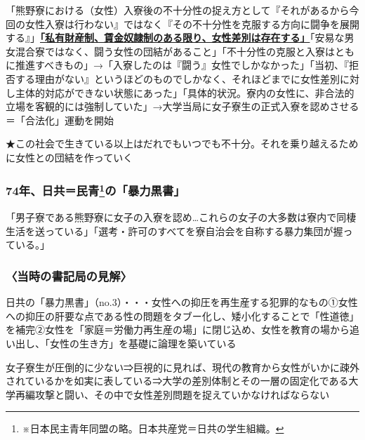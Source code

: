 \vspace{1mm}
\noindent 「熊野寮における（女性）入寮後の不十分性の捉え方として『それがあるから今回の女性入寮は行わない』ではなく『その不十分性を克服する方向に闘争を展開する』」\newline \uline{\bf{「私有財産制、賃金奴隷制のある限り、女性差別は存在する」}}\newline 「安易な男女混合寮ではなく、闘う女性の団結があること」「不十分性の克服と入寮はともに推進すべきもの」\newline →\newline 「入寮したのは『闘う』女性でしかなかった」\newline 「当初、『拒否する理由がない』というほどのものでしかなく、それほどまでに女性差別に対し主体的対応ができない状態にあった」\newline 「具体的状況。寮内の女性に、非合法的立場を客観的には強制していた」\newline →大学当局に女子寮生の正式入寮を認めさせる＝「合法化」運動を開始

\vspace{1mm}
\noindent ★この社会で生きている以上はだれでもいつでも不十分。それを乗り越えるために女性との団結を作っていく

\subsubsection{\large 74年、日共＝民青\footnote{※日本民主青年同盟の略。日本共産党＝日共の学生組織。}の「暴力黒書」}
「男子寮である熊野寮に女子の入寮を認め…これらの女子の大多数は寮内で同棲生活を送っている」\newline 「選考・許可のすべてを寮自治会を自称する暴力集団が握っている。」

\subsubsection{\large 〈当時の書記局の見解〉}
日共の「暴力黒書」（no.3）・・・女性への抑圧を再生産する犯罪的なもの\newline ①女性への抑圧の肝要な点である性の問題をタブー化し、矮小化することで「性道徳」を補完\newline ②女性を「家庭＝労働力再生産の場」に閉じ込め、女性を教育の場から追い出し、「女性の生き方」を基礎に論理を築いている

\vspace{1mm}
\noindent 女子寮生が圧倒的に少ない\newline ⇒巨視的に見れば、現代の教育から女性がいかに疎外されているかを如実に表している\newline ⇒大学の差別体制とその一層の固定化である大学再編攻撃と闘い、その中で女性差別問題を捉えていかなければならない

